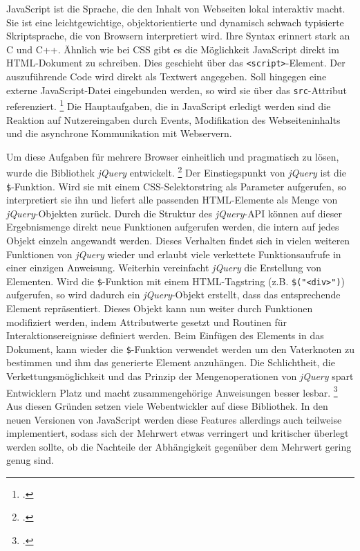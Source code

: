 \label{par:javascript}
JavaScript ist die Sprache, die den Inhalt von Webseiten lokal interaktiv macht.
Sie ist eine leichtgewichtige, objektorientierte und dynamisch schwach typisierte Skriptsprache, die von Browsern interpretiert wird.
Ihre Syntax erinnert stark an C und C++.
Ähnlich wie bei \ac{CSS} gibt es die Möglichkeit JavaScript direkt im \ac{HTML}-Dokument zu schreiben.
Dies geschieht über das \lstinline[style=eclipse]{<script>}-Element.
Der auszuführende Code wird direkt als Textwert angegeben.
Soll hingegen eine externe JavaScript-Datei eingebunden werden, so wird sie über das \lstinline[style=eclipse]{src}-Attribut referenziert.
\footcite[Vgl.][198]{webTechnologies}
Die Hauptaufgaben, die in JavaScript erledigt werden sind die Reaktion auf Nutzereingaben durch
Events, Modifikation des Webseiteninhalts und die asynchrone Kommunikation mit Webservern.

\label{par:jquery}
Um diese Aufgaben für mehrere Browser einheitlich und pragmatisch zu lösen, wurde die  Bibliothek \textit{jQuery} entwickelt.
\footcite[Vgl.][]{jqueryHomepage}
Der Einstiegspunkt von \textit{jQuery} ist die \lstinline[style=eclipse]{$}-Funktion.
Wird sie mit einem \ac{CSS}-Selektorstring als Parameter aufgerufen, so interpretiert sie ihn und liefert alle passenden \ac{HTML}-Elemente als Menge von \textit{jQuery}-Objekten zurück.
Durch die Struktur des \textit{jQuery}-\ac{API} können auf dieser Ergebnismenge direkt neue
Funktionen aufgerufen werden, die intern auf jedes Objekt einzeln angewandt werden.
Dieses Verhalten findet sich in vielen weiteren Funktionen von \textit{jQuery} wieder und erlaubt viele verkettete Funktionsaufrufe in einer einzigen Anweisung.
Weiterhin vereinfacht \textit{jQuery} die Erstellung von Elementen.
Wird die \lstinline[style=eclipse]{$}-Funktion mit einem \ac{HTML}-Tagstring (z.B.
\lstinline[style=eclipse]{$("<div>")}) aufgerufen, so wird dadurch ein \textit{jQuery}-Objekt
erstellt, dass das entsprechende Element repräsentiert.
Dieses Objekt kann nun weiter durch Funktionen modifiziert werden, indem Attributwerte gesetzt
und Routinen für Interaktionsereignisse definiert werden.
Beim Einfügen des Elements in das Dokument, kann wieder die \lstinline[style=eclipse]{$}-Funktion verwendet werden um den Vaterknoten zu bestimmen und ihm das generierte Element anzuhängen.
Die Schlichtheit, die Verkettungsmöglichkeit und das Prinzip der Mengenoperationen von \textit{jQuery} spart Entwicklern Platz und macht zusammengehörige Anweisungen besser lesbar.
\footcite[Vgl.][3\psqq]{jqueryReference}
Aus diesen Gründen setzen viele Webentwickler auf diese Bibliothek.
In den neuen Versionen von JavaScript werden diese Features allerdings auch teilweise
implementiert, sodass sich der Mehrwert etwas verringert und kritischer überlegt werden sollte, ob
die Nachteile der Abhängigkeit gegenüber dem Mehrwert gering genug sind.

